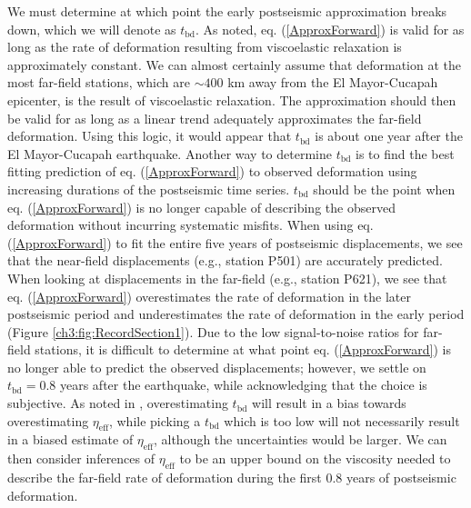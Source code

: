 We must determine at which point the early postseismic approximation breaks down, which we will denote as $t_{\mathrm{bd}}$.  As noted, eq. (\ref{ApproxForward}) is valid for as long as the rate of deformation resulting from viscoelastic relaxation is approximately constant. We can almost certainly assume that deformation at the most far-field stations, which are ${\sim}400$ km away from the El Mayor-Cucapah epicenter, is the result of viscoelastic relaxation. The approximation should then be valid for as long as a linear trend adequately approximates the far-field deformation. Using this logic, it would appear that $t_{\mathrm{bd}}$ is about one year after the El Mayor-Cucapah earthquake.  Another way to determine $t_{\mathrm{bd}}$ is to find the best fitting prediction of eq. (\ref{ApproxForward}) to observed deformation using increasing durations of the postseismic time series.  $t_\mathrm{bd}$ should be the point when eq. (\ref{ApproxForward}) is no longer capable of describing the observed deformation without incurring systematic misfits.  When using eq. (\ref{ApproxForward}) to fit the entire five years of postseismic displacements, we see that the near-field displacements (e.g., station P501) are accurately predicted. When looking at displacements in the far-field (e.g., station P621), we see that eq. (\ref{ApproxForward}) overestimates the rate of deformation in the later postseismic period and underestimates the rate of deformation in the early period (Figure \ref{ch3:fig:RecordSection1}).  Due to the low signal-to-noise ratios for far-field stations, it is difficult to determine at what point eq. (\ref{ApproxForward}) is no longer able to predict the observed displacements; however, we settle on $t_{\mathrm{bd}}=0.8$ years after the earthquake, while acknowledging that the choice is subjective. As noted in \citet{Hines2016}, overestimating $t_{\mathrm{bd}}$ will result in a bias towards overestimating $\eta_{\mathrm{eff}}$, while picking a $t_\mathrm{bd}$ which is too low will not necessarily result in a biased estimate of $\eta_\mathrm{eff}$, although the uncertainties would be larger. We can then consider inferences of $\eta_{\mathrm{eff}}$ to be an upper bound on the viscosity needed to describe the far-field rate of deformation during the first 0.8 years of postseismic deformation. 

